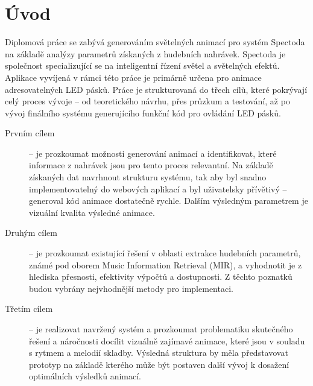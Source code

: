 \chapter*{Úvod}
{}

Diplomová práce se zabývá generováním světelných animací pro systém Spectoda na základě analýzy parametrů získaných z hudebních nahrávek. Spectoda je společnost specializující se na inteligentní řízení světel a světelných efektů. Aplikace vyvíjená v rámci této práce je primárně určena pro animace adresovatelných LED pásků. Práce je strukturovaná do třech cílů, které pokrývají celý proces vývoje -- od teoretického návrhu, přes průzkum a testování, až po vývoj finálního systému generujícího funkční kód pro ovládání LED pásků.

\begin{description}
    \item[Prvním cílem] -- je prozkoumat možnosti generování animací a identifikovat, které informace z nahrávek jsou pro tento proces relevantní. Na základě získaných dat navrhnout strukturu systému, tak aby byl snadno implementovatelný do webových aplikací a byl uživatelsky přívětivý -- generoval kód animace dostatečně rychle. Dalším výsledným parametrem je vizuální kvalita výsledné animace. 
    \item[Druhým cílem] -- je prozkoumat existující řešení v oblasti extrakce hudebních parametrů, známé pod oborem Music Information Retrieval (MIR), a vyhodnotit je z hlediska přesnosti, efektivity výpočtů a dostupnosti. Z těchto poznatků budou vybrány nejvhodnější metody pro implementaci.
    \item[Třetím cílem] -- je realizovat navržený systém a prozkoumat problematiku skutečného řešení a náročnosti docílit vizuálně zajímavé animace, které jsou v souladu s rytmem a melodií skladby. Výsledná struktura by měla představovat prototyp na základě kterého může být postaven další vývoj k dosažení optimálních výsledků animací. 
    
\end{description}




